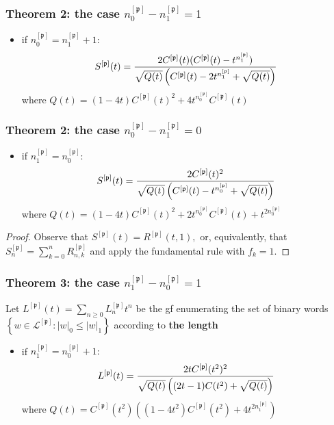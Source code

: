 \documentclass{beamer}
\begin{document}
\begin{frame}\frametitle{Theorem 2: the case $n_0^{[\mathfrak{p}]}-n_1^{[\mathfrak{p}]}=1$}
\begin{itemize}
\item if $n_0^{[\mathfrak{p}]}=n_1^{[\mathfrak{p}]}+1:$
$$S^{[\mathfrak{p}]}(t)={2C^{[\mathfrak{p}]}(t)(C^{[\mathfrak{p}]}(t)-t^{n_1^{[\mathfrak{p}]}}
) \over \sqrt{Q(t)} \left(C^{[\mathfrak{p}]}(t)-2t^{n_1^{[\mathfrak{p}]}}+ \sqrt{Q(t)} \right) }$$
    where $Q(t)={ (1-4t)C^{[\mathfrak{p}]}(t)^2+4t^{n_0^{[\mathfrak{p}]}}C^{[\mathfrak{p}]}(t)}$
\end{itemize}
\end{frame}

\begin{frame}\frametitle{Theorem 2: the case $n_0^{[\mathfrak{p}]}-n_1^{[\mathfrak{p}]}=0$}
\begin{itemize}
\item if $n_1^{[\mathfrak{p}]}=n_0^{[\mathfrak{p}]}:$
$$S^{[\mathfrak{p}]}(t)={2C^{[\mathfrak{p}]}(t)^2 \over \sqrt{Q(t)}
    \left(C^{[\mathfrak{p}]}(t)-t^{n_0^{[\mathfrak{p}]}}+ \sqrt{Q(t)} \right) }$$
where $Q(t)=(1-4t)C^{[\mathfrak{p}]}(t)^2+2t^{n_0^{[\mathfrak{p}]}}C^{[\mathfrak{p}]}(t)+t^{2n_0^{[\mathfrak{p}]}}$
\end{itemize}

\begin{proof}
Observe that $S^{[\mathfrak{p}]}(t)=R^{[\mathfrak{p}]}(t,1),$ or, equivalently, that
$S_n^{[\mathfrak{p}]}=\sum_{k=0}^nR_{n, k}^{[\mathfrak{p}]}$ and apply the
fundamental rule with $f_k=1$.
\end{proof}
\end{frame}


\begin{frame}\frametitle{Theorem 3: the case $n_1^{[\mathfrak{p}]}-n_0^{[\mathfrak{p}]}=1$}
Let $L^{[\mathfrak{p}]}(t)=\sum_{n\geq 0}L_n^{[\mathfrak{p}]}t^n$ be the
gf enumerating the set of binary words $\left\lbrace
w\in\mathcal{L}^{[\mathfrak{p}]} : |w|_0\leq |w|_1\right\rbrace$ according to
{\bf \red the length}

\begin{itemize}
\item if $n_1^{[\mathfrak{p}]}=n_0^{[\mathfrak{p}]}+1:$
$$L^{[\mathfrak{p}]}(t)= {2tC^{[\mathfrak{p}]}(t^2)^2 \over \sqrt{Q(t)}\left((2t-1)C(t^2)+ \sqrt{ Q(t) } \right)}$$
where $Q(t)=C^{[\mathfrak{p}]}(t^2)\left( (1-4t^2)C^{[\mathfrak{p}]}(t^2)+4t^{2n_1^{[\mathfrak{p}]}}\right)$
\end{itemize}
\end{frame}
\end{document}
